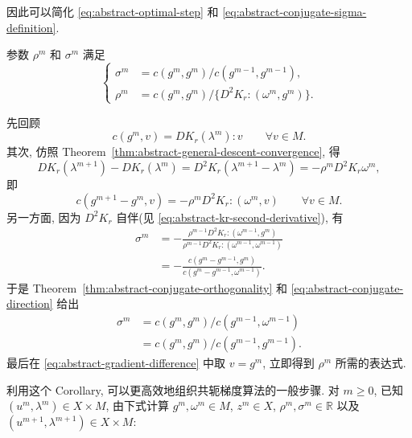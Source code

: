 因此可以简化 
\eqref{eq:abstract-optimal-step} 和
\eqref{eq:abstract-conjugate-sigma-definition}.

\setcounter{statement}{4}
\begin{Corollary}\label{cor:abstract-conjugate-parameters}
参数 $\rho^m$ 和 $\sigma^m$ 满足
\begin{equation}\label{eq:abstract-conjugate-parameter-formulas}
\left\{
\begin{aligned}
\sigma^m&=c(g^m,g^m)/c(g^{m-1},g^{m-1}),\\
\rho^m&=c(g^m,g^m)/
\{D^2K_r\mathbin{:}(\omega^m,g^m)\}.
\end{aligned}
\right.
\end{equation}
\end{Corollary}
\begin{Proof}
先回顾
\[
c(g^m,v)=DK_r(\lambda^m)\mathbin{:}v
\qquad\forall v\in M.
\]
其次, 仿照 Theorem~\ref{thm:abstract-general-descent-convergence}, 得
\[
DK_r(\lambda^{m+1})-DK_r(\lambda^m)
=D^2K_r(\lambda^{m+1}-\lambda^m)
=-\rho^mD^2K_r\omega^m,
\]
即
\begin{equation}\label{eq:abstract-gradient-difference}
c(g^{m+1}-g^m,v)
=-\rho^mD^2K_r\mathbin{:}(\omega^m,v)
\qquad\forall v\in M.
\end{equation}
另一方面, 因为 $D^2K_r$ 自伴(见
\eqref{eq:abstract-kr-second-derivative}), 有
\[
\begin{aligned}
\sigma^m
&=-\frac{\rho^{m-1}D^2K_r\mathbin{:}(\omega^{m-1},g^m)}
{\rho^{m-1}D^2K_r\mathbin{:}(\omega^{m-1},\omega^{m-1})}\\
&=-\frac{c(g^m-g^{m-1},g^m)}
{c(g^m-g^{m-1},\omega^{m-1})}.
\end{aligned}
\]
于是 Theorem~\ref{thm:abstract-conjugate-orthogonality} 和
\eqref{eq:abstract-conjugate-direction} 给出
\[
\begin{aligned}
\sigma^m
&=c(g^m,g^m)/c(g^{m-1},\omega^{m-1})\\
&=c(g^m,g^m)/c(g^{m-1},g^{m-1}).
\end{aligned}
\]
最后在 
\eqref{eq:abstract-gradient-difference} 中取 $v=g^m$,
立即得到 $\rho^m$ 所需的表达式.
\end{Proof}

利用这个 Corollary, 可以更高效地组织共轭梯度算法的一般步骤.
对 $m\ge0$, 已知 $(u^m,\lambda^m)\in X\times M$, 由下式计算
$g^m,\omega^m\in M$, $z^m\in X$, $\rho^m,\sigma^m\in\mathbb R$
以及 $(u^{m+1},\lambda^{m+1})\in X\times M$:

